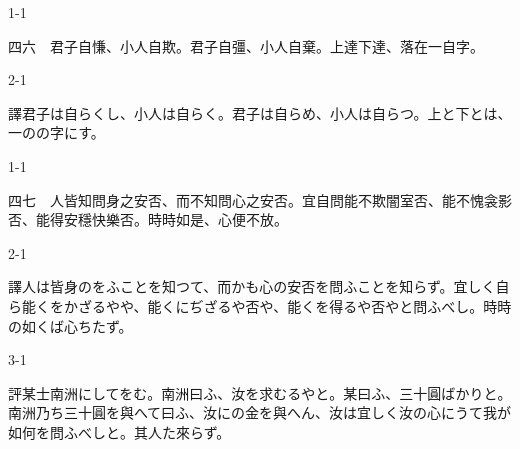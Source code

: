 \documentclass[tate,paper=b6j,jafontsize=9pt]{jlreq}
\begin{document}
\begin{azconvIndented}{1\zw}{-1\zw}

四六　君子自慊、小人自欺。君子自彊、小人自棄。上達下達、落在一自字。

\end{azconvIndented}
\begin{azconvIndented}{2\zw}{-1\zw}

譯君子は自らくし、小人は自らく。君子は自らめ、小人は自らつ。上と下とは、一のの字にす。

\end{azconvIndented}

\begin{azconvIndented}{1\zw}{-1\zw}

四七　人皆知問身之安否、而不知問心之安否。宜自問能不欺闇室否、能不愧衾影否、能得安穩快樂否。時時如是、心便不放。

\end{azconvIndented}
\begin{azconvIndented}{2\zw}{-1\zw}

譯人は皆身のをふことを知つて、而かも心の安否を問ふことを知らず。宜しく自ら能くをかざるやや、能くにぢざるや否や、能くを得るや否やと問ふべし。時時の如くば心ちたず。

\end{azconvIndented}
\begin{azconvIndented}{3\zw}{-1\zw}

評某士南洲にしてをむ。南洲曰ふ、汝を求むるやと。某曰ふ、三十圓ばかりと。南洲乃ち三十圓を與へて曰ふ、汝にの金を與へん、汝は宜しく汝の心にうて我が如何を問ふべしと。其人た來らず。

\end{azconvIndented}
\end{document}
